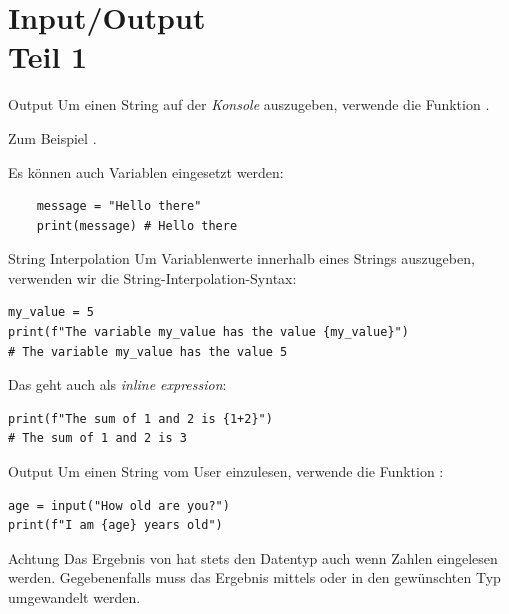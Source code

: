 \section{Input/Output \\ \footnotesize Teil 1}

\begin{fragile}[]

\begin{block}{Output}
	\vspace{2pt}
	Um einen String auf der \emph{Konsole} auszugeben, verwende die Funktion . 
	
	
	Zum Beispiel . 
	\pause
	
	Es können auch Variablen eingesetzt werden: 
	\begin{verbatim}
	message = "Hello there"
	print(message) # Hello there
	\end{verbatim}
	
	\end{block}
	
\end{fragile}

\begin{fragile}[]
	
\begin{block}{String Interpolation}
\vspace{2pt}
Um Variablenwerte innerhalb eines Strings auszugeben, verwenden wir die String-Interpolation-Syntax:
\begin{verbatim}
my_value = 5
print(f"The variable my_value has the value {my_value}")
# The variable my_value has the value 5
\end{verbatim}
\pause
Das geht auch als \textit{inline expression}: 
\begin{verbatim}
print(f"The sum of 1 and 2 is {1+2}")
# The sum of 1 and 2 is 3
\end{verbatim}

\end{block}
	
\end{fragile}

\begin{fragile}
\begin{block}{Output}
	\vspace{2pt}
Um einen String vom User einzulesen, verwende die Funktion :

\begin{verbatim}
age = input("How old are you?")
print(f"I am {age} years old")
\end{verbatim}
\end{block}
\pause 
\begin{alertblock}{Achtung}
	\vspace{2pt}
Das Ergebnis von  hat stets den Datentyp  auch wenn Zahlen eingelesen werden. Gegebenenfalls muss das Ergebnis mittels  oder  in den gewünschten Typ umgewandelt werden. 	
\end{alertblock}

\end{fragile}

